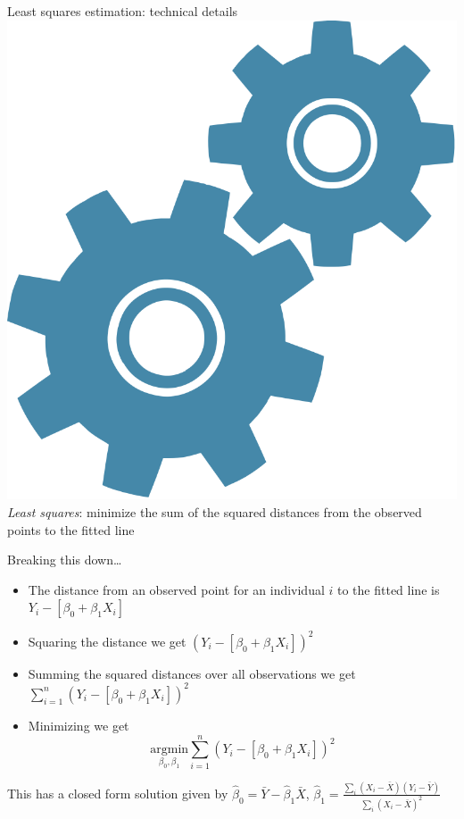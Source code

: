 \documentclass[10pt,t]{beamer}
\begin{document}
\begin{frame}{Least squares estimation: technical details \includegraphics[scale=0.02]{figures/technical}}
\textit{Least squares}: minimize the sum of the squared distances from the observed points to the fitted line

\vspace{0.3cm}

Breaking this down\dots

\vspace{0.3cm}

\begin{itemize}
	\item The distance from an observed point for an individual $i$ to the fitted line is $Y_i - [\beta_0 + \beta_1 X_i]$
	\item Squaring the distance we get $(Y_i - [\beta_0 + \beta_1 X_i])^2$
	\item Summing the squared distances over all observations we get $\sum_{i = 1}^n (Y_i - [\beta_0 + \beta_1 X_i])^2$
	\item Minimizing we get $$\underset{\beta_0, \beta_1}{\text{argmin}} \sum_{i = 1}^n (Y_i - [\beta_0 + \beta_1 X_i])^2$$
\end{itemize}

\vspace{0.3cm}

\small This has a closed form solution given by $\hat{\beta}_0 =  \bar{Y} - \hat{\beta}_1 \bar{X}$, $\hat{\beta}_1 = \frac{\sum_i (X_i - \bar{X}) (Y_i - \bar{Y})}{\sum_i (X_i - \bar{X})^2}$

\end{frame}
\end{document}
